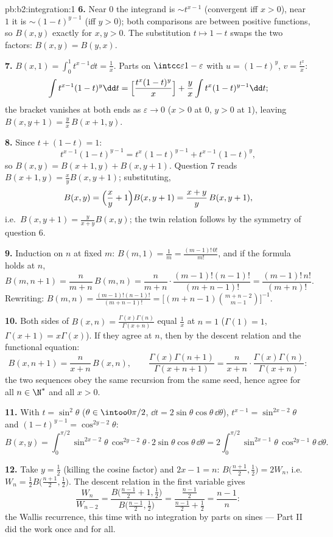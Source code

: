 \begin{solution}{pb:b2:integration:1}
\textbf{6.} Near $0$ the integrand is $\sim t^{x-1}$
(convergent iff $x > 0$), near $1$ it is $\sim (1-t)^{y-1}$
(iff $y > 0$); both comparisons are between positive functions,
so $B(x,y)$  exactly for $x, y > 0$. The substitution
$t \mapsto 1 - t$ swaps the two factors: $B(x,y) = B(y,x)$.

\textbf{7.} $B(x,1) = \int_0^1 t^{x-1}\dd t = \frac1x$. Parts
on $\intcc\varepsilon{1-\varepsilon}$ with $u = (1-t)^y$, $v =
\frac{t^x}{x}$:
\[
\int t^{x-1}(1-t)^{y}\dd t
= \Bigl[\frac{t^x(1-t)^y}{x}\Bigr]
+ \frac{y}{x}\int t^{x}(1-t)^{y-1}\dd t ;
\]
the bracket vanishes at both ends as $\varepsilon \to 0$ ($x >
0$ at $0$, $y > 0$ at $1$), leaving $B(x, y+1) = \frac
yx\,B(x+1, y)$.

\textbf{8.} Since $t + (1-t) = 1$:
\[
t^{x-1}(1-t)^{y-1} = t^{x}(1-t)^{y-1} + t^{x-1}(1-t)^{y},
\]
so $B(x,y) = B(x+1,y) + B(x,y+1)$. Question 7 reads $B(x+1,y) =
\frac xy B(x,y+1)$; substituting,
\[
B(x,y) = \Bigl(\frac xy + 1\Bigr)B(x,y+1)
= \frac{x+y}{y}\,B(x,y+1),
\]
i.e.\ $B(x,y+1) = \frac{y}{x+y}B(x,y)$; the twin relation
follows by the symmetry of question 6.

\textbf{9.} Induction on $n$ at fixed $m$: $B(m,1) = \frac1m =
\frac{(m-1)!\,0!}{m!}$, and if the formula holds at $n$,
\[
B(m, n+1) = \frac{n}{m+n}\,B(m,n)
= \frac{n}{m+n}\cdot\frac{(m-1)!(n-1)!}{(m+n-1)!}
= \frac{(m-1)!\,n!}{(m+n)!} .
\]
Rewriting: $B(m,n) = \frac{(m-1)!(n-1)!}{(m+n-1)!} =
\bigl[(m+n-1)\binom{m+n-2}{m-1}\bigr]^{-1}$.

\textbf{10.} Both sides of $B(x,n) =
\frac{\Gamma(x)\Gamma(n)}{\Gamma(x+n)}$ equal $\frac1x$ at $n =
1$ ($\Gamma(1) = 1$, $\Gamma(x+1) = x\Gamma(x)$). If they agree
at $n$, then by the descent relation and the functional
equation:
\[
B(x, n+1) = \frac{n}{x+n}\,B(x,n), \qquad
\frac{\Gamma(x)\Gamma(n+1)}{\Gamma(x+n+1)}
= \frac{n}{x+n}\cdot
\frac{\Gamma(x)\Gamma(n)}{\Gamma(x+n)} :
\]
the two sequences obey the same recursion from the same seed,
hence agree for all $n \in \N^*$ and all $x > 0$.

\textbf{11.} With $t = \sin^2\theta$ ($\theta \in
\intoo0{\pi/2}$, $\dd t = 2\sin\theta\cos\theta\,\dd\theta$),
$t^{x-1} = \sin^{2x-2}\theta$ and $(1-t)^{y-1} =
\cos^{2y-2}\theta$:
\[
B(x,y) = \int_0^{\pi/2}\sin^{2x-2}\theta\,\cos^{2y-2}\theta
\cdot 2\sin\theta\cos\theta\,\dd\theta
= 2\int_0^{\pi/2}\sin^{2x-1}\theta\,\cos^{2y-1}\theta\,
\dd\theta .
\]

\textbf{12.} Take $y = \frac12$ (killing the cosine factor) and
$2x - 1 = n$: $B\bigl(\frac{n+1}2, \frac12\bigr) = 2W_n$, i.e.\
$W_n = \frac12 B\bigl(\frac{n+1}2,\frac12\bigr)$. The descent
relation in the first variable gives
\[
\frac{W_n}{W_{n-2}}
= \frac{B\bigl(\frac{n-1}2 + 1, \frac12\bigr)}
{B\bigl(\frac{n-1}2, \frac12\bigr)}
= \frac{\frac{n-1}2}{\frac{n-1}2 + \frac12}
= \frac{n-1}{n} :
\]
the Wallis recurrence, this time with no integration by parts
on sines --- Part II did the work once and for all.


\end{solution}
